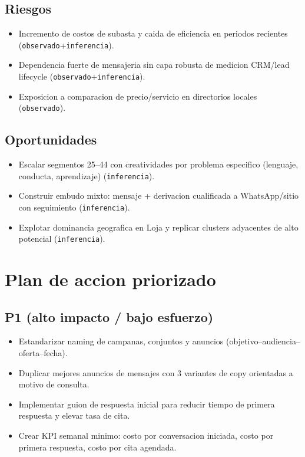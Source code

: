 \documentclass[9pt,a4paper,twocolumn,twoside]{tau-class/tau}
\begin{document}
\subsection{Riesgos}
\begin{itemize}
  \item Incremento de costos de subasta y caida de eficiencia en periodos recientes (\texttt{observado}+\texttt{inferencia}).
  \item Dependencia fuerte de mensajeria sin capa robusta de medicion CRM/lead lifecycle (\texttt{observado}+\texttt{inferencia}).
  \item Exposicion a comparacion de precio/servicio en directorios locales (\texttt{observado}).
\end{itemize}

\subsection{Oportunidades}
\begin{itemize}
  \item Escalar segmentos 25--44 con creatividades por problema especifico (lenguaje, conducta, aprendizaje) (\texttt{inferencia}).
  \item Construir embudo mixto: mensaje + derivacion cualificada a WhatsApp/sitio con seguimiento (\texttt{inferencia}).
  \item Explotar dominancia geografica en Loja y replicar clusters adyacentes de alto potencial (\texttt{inferencia}).
\end{itemize}

\section{Plan de accion priorizado}

\subsection{P1 (alto impacto / bajo esfuerzo)}
\begin{itemize}
  \item Estandarizar naming de campanas, conjuntos y anuncios (objetivo--audiencia--oferta--fecha).
  \item Duplicar mejores anuncios de mensajes con 3 variantes de copy orientadas a motivo de consulta.
  \item Implementar guion de respuesta inicial para reducir tiempo de primera respuesta y elevar tasa de cita.
  \item Crear KPI semanal minimo: costo por conversacion iniciada, costo por primera respuesta, costo por cita agendada.
\end{itemize}
\end{document}
